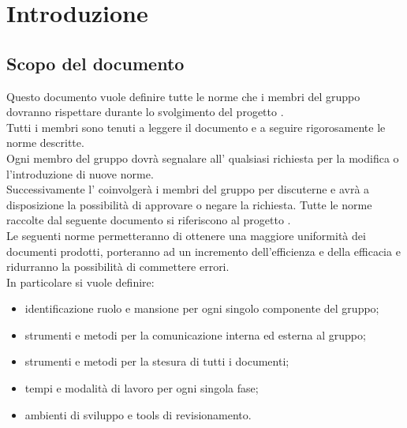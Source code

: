 %


\section{Introduzione}


\subsection{Scopo del documento}
Questo documento vuole definire tutte le norme che i membri del gruppo \groupName{} dovranno rispettare durante lo svolgimento del progetto \projectName.\\
Tutti i membri sono tenuti a leggere il documento e a seguire rigorosamente le norme descritte.\\
Ogni membro del gruppo dovrà segnalare all'\roleAdministrator{} qualsiasi richiesta per la modifica o l'introduzione di nuove norme.\\
Successivamente l'\roleAdministrator{} coinvolgerà i membri del gruppo per discuterne e avrà a disposizione la possibilità di approvare o negare la richiesta.
Tutte le norme raccolte dal seguente documento si riferiscono al progetto \projectName.\\
Le seguenti norme permetteranno di ottenere una maggiore uniformità dei documenti prodotti, porteranno ad un incremento dell'efficienza e della efficacia e ridurranno la possibilità di commettere errori.\\
In particolare si vuole definire:
\begin{itemize}
\item identificazione ruolo e mansione per ogni singolo componente del gruppo;
\item strumenti e metodi per la comunicazione interna ed esterna al gruppo;
\item strumenti e metodi per la stesura di tutti i documenti;
\item tempi e modalità di lavoro per ogni singola fase;
\item ambienti di sviluppo e tools di revisionamento.
\end{itemize}




